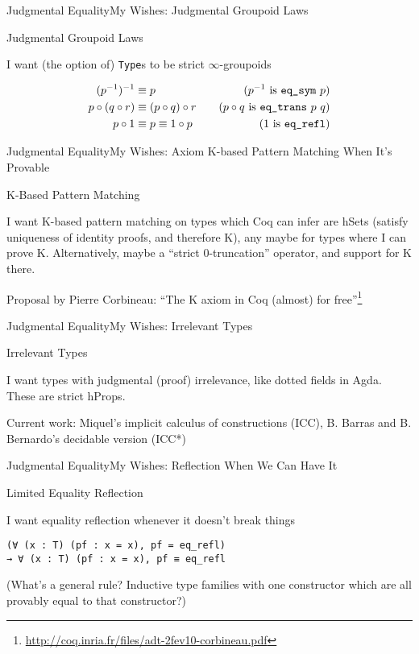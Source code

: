 \documentclass{beamer}
\begin{document}
\begin{frame}[fragile]{Judgmental Equality}{My Wishes: Judgmental Groupoid Laws}
  \Large
  \begin{center}
    Judgmental Groupoid Laws
  \end{center}
  I want (the option of) \texttt{Type}s to be strict $\infty$-groupoids
  
  \begin{align*}
    (p^{-1})^{-1} & \equiv p & \text{($p^{-1}$ is \texttt{eq\_sym} $p$)} \\
    p \circ (q \circ r) & \equiv (p \circ q) \circ r\quad & \text{($p \circ q$ is \texttt{eq\_trans} $p$ $q$)} \\
    p \circ 1 & \equiv p \equiv 1 \circ p & \text{(1 is \texttt{eq\_refl})}
  \end{align*}
\end{frame}

\begin{frame}[fragile]{Judgmental Equality}{My Wishes: Axiom K-based Pattern Matching When It's Provable}
  \Large
  \begin{center}
    K-Based Pattern Matching
  \end{center}
  I want K-based pattern matching on types which Coq can infer are hSets (satisfy uniqueness of identity proofs, and therefore K), any maybe for types where I can prove K. \pause  Alternatively, maybe a ``strict 0-truncation'' operator, and support for K there. \pause
  
  Proposal by Pierre Corbineau: ``The K axiom in Coq (almost) for free''\footnote<3->{\url{http://coq.inria.fr/files/adt-2fev10-corbineau.pdf}}
\end{frame}

\begin{frame}[fragile]{Judgmental Equality}{My Wishes: Irrelevant Types}
  \Large
  \begin{center}
    Irrelevant Types
  \end{center}
  I want types with judgmental (proof) irrelevance, like dotted fields in Agda. \pause  These are strict hProps.  \pause
  
  Current work: Miquel's implicit calculus of constructions (ICC), B. Barras and B. Bernardo's decidable version (ICC*)
\end{frame}

\begin{frame}[fragile]{Judgmental Equality}{My Wishes: Reflection When We Can Have It}
  \Large
  \begin{center}
    Limited Equality Reflection
  \end{center}
  I want equality reflection whenever it doesn't break things
\begin{verbatim}
(∀ (x : T) (pf : x = x), pf = eq_refl)
→ ∀ (x : T) (pf : x = x), pf ≡ eq_refl    
\end{verbatim}
\pause
  (What's a general rule?  Inductive type families with one constructor which are all provably equal to that constructor?)
\end{frame}
\end{document}
